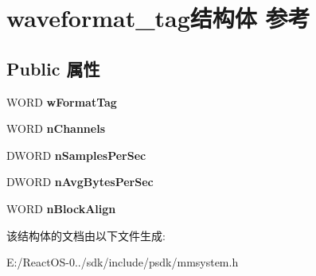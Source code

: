 \hypertarget{structwaveformat__tag}{}\section{waveformat\+\_\+tag结构体 参考}
\label{structwaveformat__tag}
\subsection*{Public 属性}
\begin{DoxyCompactItemize}
\item 
\mbox{\label{structwaveformat__tag_aa265471073115f0ca6c4f0d54b9289ad}} 
W\+O\+RD {\bfseries w\+Format\+Tag}
\item 
\mbox{\label{structwaveformat__tag_a8fcf4c36bbf892408300b83c98761f17}} 
W\+O\+RD {\bfseries n\+Channels}
\item 
\mbox{\label{structwaveformat__tag_a283ebdbaf6b3b233ae72e06a20b56cd4}} 
D\+W\+O\+RD {\bfseries n\+Samples\+Per\+Sec}
\item 
\mbox{\label{structwaveformat__tag_aed86a675e8e6e85ff0c79b72a0b1caff}} 
D\+W\+O\+RD {\bfseries n\+Avg\+Bytes\+Per\+Sec}
\item 
\mbox{\label{structwaveformat__tag_a73d8331185bccf04f562fc060ad0e130}} 
W\+O\+RD {\bfseries n\+Block\+Align}
\end{DoxyCompactItemize}


该结构体的文档由以下文件生成\+:\begin{DoxyCompactItemize}
\item 
E\+:/\+React\+O\+S-\/0../sdk/include/psdk/mmsystem.\+h\end{DoxyCompactItemize}
